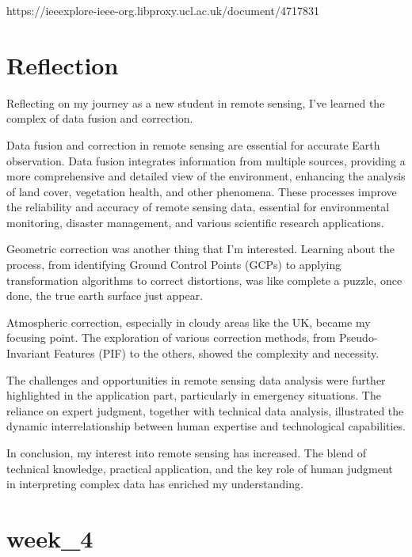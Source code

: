 \documentclass[
  letterpaper,
  DIV=11,
  numbers=noendperiod]{scrreprt}
\begin{document}
https://ieeexplore-ieee-org.libproxy.ucl.ac.uk/document/4717831


\chapter{Reflection}\label{reflection-1}

Reflecting on my journey as a new student in remote sensing, I've
learned the complex of data fusion and correction.

Data fusion and correction in remote sensing are essential for accurate
Earth observation. Data fusion integrates information from multiple
sources, providing a more comprehensive and detailed view of the
environment, enhancing the analysis of land cover, vegetation health,
and other phenomena. These processes improve the reliability and
accuracy of remote sensing data, essential for environmental monitoring,
disaster management, and various scientific research applications.

Geometric correction was another thing that I'm interested. Learning
about the process, from identifying Ground Control Points (GCPs) to
applying transformation algorithms to correct distortions, was like
complete a puzzle, once done, the true earth surface just appear.

Atmospheric correction, especially in cloudy areas like the UK, became
my focusing point. The exploration of various correction methods, from
Pseudo-Invariant Features (PIF) to the others, showed the complexity and
necessity.

The challenges and opportunities in remote sensing data analysis were
further highlighted in the application part, particularly in emergency
situations. The reliance on expert judgment, together with technical
data analysis, illustrated the dynamic interrelationship between human
expertise and technological capabilities.

In conclusion, my interest into remote sensing has increased. The blend
of technical knowledge, practical application, and the key role of human
judgment in interpreting complex data has enriched my understanding.


\chapter{week\_4}\label{week_4}

\end{document}
